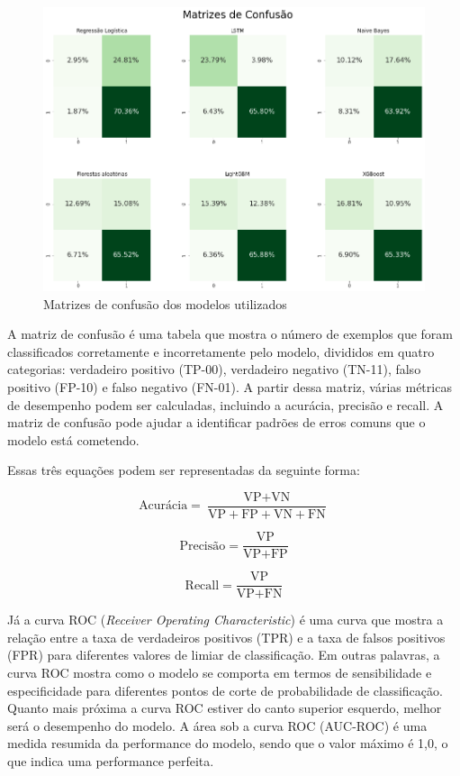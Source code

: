 \begin{figure}[H]
    \centering
    \includegraphics[scale=0.5]{./figs/confusion.png}
    \caption{Matrizes de confusão dos modelos utilizados}
    \label{fig:mconfusion}
\end{figure}

A matriz de confusão é uma tabela que mostra o número de exemplos que foram classificados corretamente e incorretamente pelo modelo, divididos em quatro categorias: verdadeiro positivo (TP-00), verdadeiro negativo (TN-11), falso positivo (FP-10) e falso negativo (FN-01). A partir dessa matriz, várias métricas de desempenho podem ser calculadas, incluindo a acurácia, precisão e recall. A matriz de confusão pode ajudar a identificar padrões de erros comuns que o modelo está cometendo.

Essas três equações podem ser representadas da seguinte forma:

\begin{equation}
    \text{Acurácia} = \frac{\text{VP} + \text{VN}}{\text{VP} + \text{FP} + \text{VN} + \text{FN}}
\end{equation}

\begin{equation}
    \text{Precisão} = \frac{\text{VP}}{\text{VP} + \text{FP}}
\end{equation}

\begin{equation}
    \text{Recall} = \frac{\text{VP}}{\text{VP} + \text{FN}}
\end{equation}

Já a curva ROC (\textit{Receiver Operating Characteristic}) é uma curva que mostra a relação entre a taxa de verdadeiros positivos (TPR) e a taxa de falsos positivos (FPR) para diferentes valores de limiar de classificação. Em outras palavras, a curva ROC mostra como o modelo se comporta em termos de sensibilidade e especificidade para diferentes pontos de corte de probabilidade de classificação. Quanto mais próxima a curva ROC estiver do canto superior esquerdo, melhor será o desempenho do modelo. A área sob a curva ROC (AUC-ROC) é uma medida resumida da performance do modelo, sendo que o valor máximo é 1,0, o que indica uma performance perfeita.

